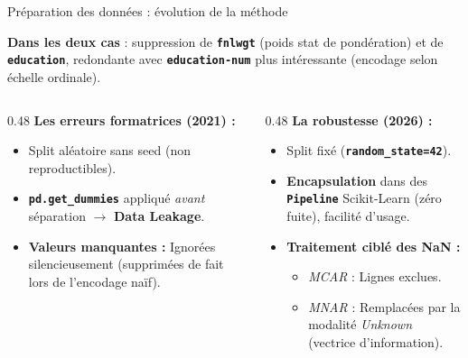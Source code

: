 \documentclass[aspectratio=169, 10pt]{beamer}
\newcommand{\mytexttt}[1]{\texttt{\textbf{\textcolor{colortt}{#1}}}}
\begin{document}
\begin{frame}{Préparation des données : évolution de la méthode}

\textbf{Dans les deux cas} : suppression de \mytexttt{fnlwgt} (poids stat de pondération) et de \mytexttt{education}, redondante avec \mytexttt{education-num} plus intéressante (encodage selon échelle ordinale).
\pause

\vspace{0.3cm}
    \begin{columns}[T]
        \begin{column}{0.48\textwidth}
            \textbf{Les erreurs formatrices (2021) :}
            \begin{itemize}
                \item<3-> Split aléatoire sans seed (non reproductibles).
                \item<4-> \mytexttt{pd.get\_dummies} appliqué \textit{avant} séparation $\rightarrow$ \alert{\textbf{Data Leakage}}.
                \item<5-> \textbf{Valeurs manquantes :} Ignorées silencieusement (supprimées de fait lors de l'encodage naïf).
            \end{itemize}
        \end{column}
        
        \begin{column}{0.48\textwidth}
            \textbf{La robustesse (2026) :}
            \begin{itemize}
                \item<3-> Split fixé (\mytexttt{random\_state=42}).
                \item<4-> \textbf{Encapsulation} dans des \mytexttt{Pipeline} Scikit-Learn (zéro fuite), facilité d'usage.
                \item<5-> \textbf{Traitement ciblé des NaN :}
                \begin{itemize}
                    \item<6->[\textcolor{sklorange}{$\rightarrow$}] \textit{MCAR} : Lignes exclues.
                    \item<7->[\textcolor{sklorange}{$\rightarrow$}] \textit{MNAR} : Remplacées par la modalité \textit{Unknown} (vectrice d'information).
                \end{itemize}
            \end{itemize}
        \end{column}
    \end{columns}
\end{frame}
\end{document}
